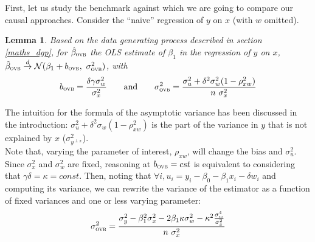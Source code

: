 \documentclass[usletter, 12pt]{article}
\newtheorem{lemma}{Lemma}
\begin{document}
				First, let us study the benchmark against which we are going to compare our causal approaches. Consider the ``naive'' regression of $y$ on $x$ (with $w$ omitted). 
%				
						
				\begin{lemma}\label{lemma_ovb}
					Based on the data generating process described in section \ref{maths_dgp}, for $\hat{\beta}_{\textsc{ovb}}$ the OLS estimate of $\beta_{1}$ in the regression of $y$ on $x$, $\hat{\beta}_{\textsc{ovb}} \overset{d}{\to} \mathcal{N}(\beta_{1} + b_{\textsc{ovb}} , \ \sigma_{\textsc{ovb}}^{2})$, with
					\[
						b_{\textsc{ovb}} = \dfrac{\delta \gamma \sigma_{w}^{2}}{\sigma_{x}^{2}} 
						\qquad \text{and} \qquad
						\sigma_{\textsc{ovb}}^{2} = \dfrac{\sigma_{u}^{2} + \delta^{2} \sigma_{w}^{2}(1 - \rho_{xw}^{2})}{n \ \sigma_{x}^{2}}
					\]
				\end{lemma}
				
			The intuition for the formula of the asymptotic variance has been discussed in the introduction: $\sigma_{u}^{2} + \delta^{2} \sigma_{w}(1 - \rho_{xw}^{2})$ is the part of the variance in $y$ that is not explained by $x$ ($\sigma^{2}_{y^{\perp x}}$).\\
			
			Note that, varying the parameter of interest, $\rho_{xw}$, will change the bias and $\sigma_{u}^{2}$. Since $\sigma_{x}^{2}$ and $\sigma_{w}^{2}$ are fixed, reasoning at $b_{\textsc{ovb}} = cst$ is equivalent to considering that $\gamma \delta = \kappa = const$. Then, noting that $\forall i, u_{i} = y_i - \beta_{0} - \beta_{1}x_{i} - \delta w_{i}$ and computing its variance, we can rewrite the variance of the estimator as a function of fixed variances and one or less varying parameter:
			~
			\[
				\sigma_{\textsc{ovb}}^{2} = \dfrac{\sigma_{y}^{2} - \beta_{1}^{2}\sigma_{x}^{2} - 2\beta_{1}\kappa\sigma_{w}^{2} - \kappa^{2}\frac{\sigma_{w}^{4}}{\sigma_{x}^{2}}}{n \ \sigma_{x}^{2}}
			\]
			
\end{document}
